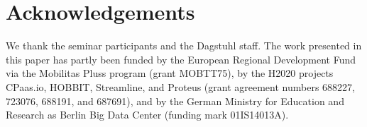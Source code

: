 \section*{Acknowledgements}
\small
We thank the seminar participants and the Dagstuhl staff.
The work presented in this paper has partly been funded
%
by the European Regional Development Fund via the Mobilitas Pluss
program (grant MOBTT75),
%
by the H2020 projects CPaas.io, HOBBIT, Streamline, and Proteus (grant
agreement numbers 688227, 723076, 688191, and 687691),
%
and by the German Ministry for Education and Research as Berlin Big
Data Center (funding mark 01IS14013A).
